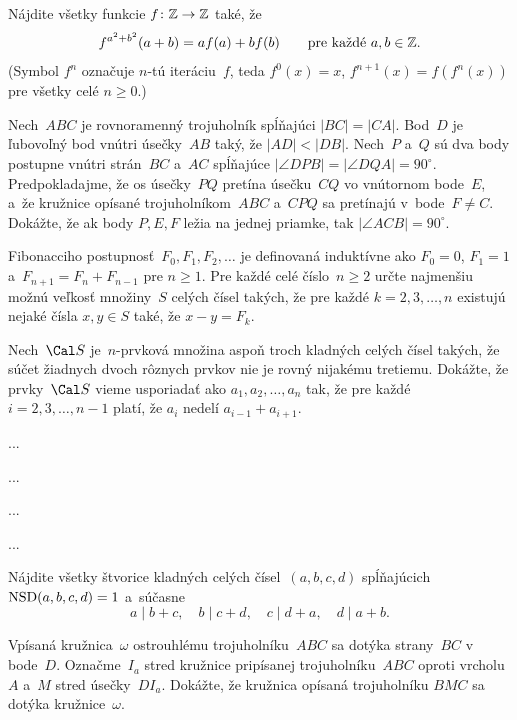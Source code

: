 {%

Nájdite všetky funkcie $f\colon {\Bbb Z} \to {\Bbb Z}$ také, že
$$
f^{a^2+b^2}(a+b)=af(a)+bf(b)
\qquad \hbox{pre každé $a,b \in {\Bbb Z}$.}
$$
(Symbol $f^n$ označuje $n$-tú iteráciu~$f$, teda $f^0(x)=x$, $f^{n+1}(x)=f(f^n(x))$ pre všetky celé $n \ge 0$.)
}

{%

Nech~$ABC$ je rovnoramenný trojuholník spĺňajúci $|BC|=|CA|$. Bod~$D$ je ľubovoľný bod vnútri úsečky~$AB$ taký, že $|AD|<|DB|$. Nech~$P$ a~$Q$ sú dva body postupne vnútri strán~$BC$ a~$AC$ spĺňajúce $|\angle DPB|=|\angle DQA|=90^\circ$. Predpokladajme, že os úsečky~$PQ$ pretína úsečku~$CQ$ vo vnútornom bode~$E$, a~že kružnice opísané trojuholníkom~$ABC$ a~$CPQ$ sa pretínajú v~bode~$F \ne C$. Dokážte, že ak body $P,E,F$ ležia na jednej priamke, tak $|\angle ACB|=90^\circ$.
}

{%

Fibonacciho postupnosť~$F_0,F_1,F_2,\ldots$ je definovaná induktívne ako $F_0=0$, $F_1=1$ a~$F_{n+1}=F_{n}+F_{n-1}$ pre $n \ge 1$. Pre každé celé číslo~$n \ge 2$ určte najmenšiu možnú veľkosť množiny~$S$ celých čísel takých, že pre každé $k=2,3,\ldots,n$ existujú nejaké čísla $x,y \in S$ také, že $x-y=F_k$.
}

{%

Nech~${\Cal S}$ je~$n$-prvková množina aspoň troch kladných celých čísel takých, že súčet žiadnych dvoch rôznych prvkov nie je rovný nijakému tretiemu. Dokážte, že prvky~${\Cal S}$ vieme usporiadať ako $a_1,a_2,\ldots,a_n$ tak, že pre každé $i=2,3,\ldots,n-1$ platí, že $a_i$ nedelí $a_{i-1}+a_{i+1}$.
}

{%
...}

{%
...}

{%
...}

{%
...}

{%
Nájdite všetky štvorice kladných celých čísel~$(a, b, c, d)$ spĺňajúcich $\hbox{NSD}(a, b, c, d) = 1$ a~súčasne
$$
a \mid b + c,\quad
b \mid c + d,\quad
c \mid d + a,\quad
d \mid a + b.
$$
}

{%
Vpísaná kružnica~$\omega$ ostrouhlému trojuholníku~$ABC$ sa dotýka strany~$BC$ v bode~$D$. Označme~$I_a$ stred kružnice pripísanej trojuholníku~$ABC$ oproti vrcholu~$A$ a~$M$ stred úsečky~$DI_a$. Dokážte, že kružnica opísaná trojuholníku $BMC$ sa dotýka kružnice~$\omega$.
}

